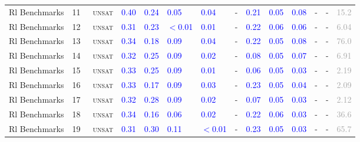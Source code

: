 \begin{center}
{\begin{longtable}{@{}llllllllllllll@{}}
Rl Benchmarks & 11 & ~\textsc{unsat} & \textcolor{blue}{0.40} & \textcolor{blue}{0.24} & \textcolor{blue}{0.05} & \textcolor{blue}{0.04} & - & \textcolor{blue}{0.21} & \textcolor{blue}{0.05} & \textcolor{blue}{0.08} & - & - & \textcolor{darkgray}{15.2} \\
Rl Benchmarks & 12 & ~\textsc{unsat} & \textcolor{blue}{0.31} & \textcolor{blue}{0.23} & \textcolor{blue}{$<$0.01} & \textcolor{blue}{0.01} & - & \textcolor{blue}{0.22} & \textcolor{blue}{0.06} & \textcolor{blue}{0.06} & - & - & \textcolor{darkgray}{6.04} \\
Rl Benchmarks & 13 & ~\textsc{unsat} & \textcolor{blue}{0.34} & \textcolor{blue}{0.18} & \textcolor{blue}{0.09} & \textcolor{blue}{0.04} & - & \textcolor{blue}{0.22} & \textcolor{blue}{0.05} & \textcolor{blue}{0.08} & - & - & \textcolor{darkgray}{76.0} \\
Rl Benchmarks & 14 & ~\textsc{unsat} & \textcolor{blue}{0.32} & \textcolor{blue}{0.25} & \textcolor{blue}{0.09} & \textcolor{blue}{0.02} & - & \textcolor{blue}{0.08} & \textcolor{blue}{0.05} & \textcolor{blue}{0.07} & - & - & \textcolor{darkgray}{6.91} \\
Rl Benchmarks & 15 & ~\textsc{unsat} & \textcolor{blue}{0.33} & \textcolor{blue}{0.25} & \textcolor{blue}{0.09} & \textcolor{blue}{0.01} & - & \textcolor{blue}{0.06} & \textcolor{blue}{0.05} & \textcolor{blue}{0.03} & - & - & \textcolor{darkgray}{2.19} \\
Rl Benchmarks & 16 & ~\textsc{unsat} & \textcolor{blue}{0.33} & \textcolor{blue}{0.17} & \textcolor{blue}{0.09} & \textcolor{blue}{0.03} & - & \textcolor{blue}{0.23} & \textcolor{blue}{0.05} & \textcolor{blue}{0.04} & - & - & \textcolor{darkgray}{2.09} \\
Rl Benchmarks & 17 & ~\textsc{unsat} & \textcolor{blue}{0.32} & \textcolor{blue}{0.28} & \textcolor{blue}{0.09} & \textcolor{blue}{0.02} & - & \textcolor{blue}{0.07} & \textcolor{blue}{0.05} & \textcolor{blue}{0.03} & - & - & \textcolor{darkgray}{2.12} \\
Rl Benchmarks & 18 & ~\textsc{unsat} & \textcolor{blue}{0.34} & \textcolor{blue}{0.16} & \textcolor{blue}{0.06} & \textcolor{blue}{0.02} & - & \textcolor{blue}{0.22} & \textcolor{blue}{0.06} & \textcolor{blue}{0.03} & - & - & \textcolor{darkgray}{36.6} \\
Rl Benchmarks & 19 & ~\textsc{unsat} & \textcolor{blue}{0.31} & \textcolor{blue}{0.30} & \textcolor{blue}{0.11} & \textcolor{blue}{$<$0.01} & - & \textcolor{blue}{0.23} & \textcolor{blue}{0.05} & \textcolor{blue}{0.03} & - & - & \textcolor{darkgray}{65.7} \\

\end{longtable}}
\end{center}
